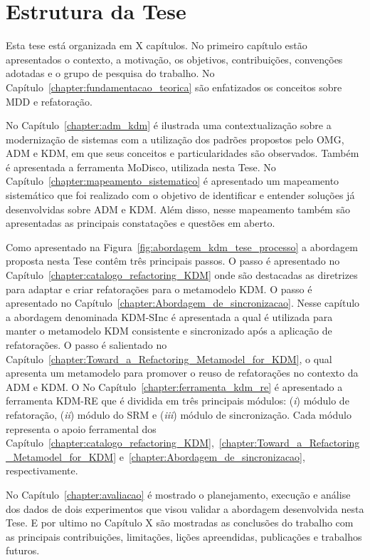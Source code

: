 \section{Estrutura da Tese}

Esta tese está organizada em X capítulos. No primeiro capítulo estão apresentados o contexto, a motivação, os objetivos, contribuições, convenções adotadas e o grupo de pesquisa do trabalho. No Capítulo~\ref{chapter:fundamentacao_teorica} são enfatizados os conceitos sobre MDD e refatoração.

No Capítulo~\ref{chapter:adm_kdm} é ilustrada uma contextualização sobre a modernização de sistemas com a utilização dos padrões propostos pelo OMG, ADM e KDM, em que seus conceitos e particularidades são observados. Também é apresentada a ferramenta MoDisco, utilizada nesta Tese. No Capítulo~\ref{chapter:mapeamento_sistematico} é apresentado um mapeamento sistemático que foi realizado com o objetivo de identificar e entender soluções já desenvolvidas sobre ADM e KDM. Além disso, nesse mapeamento também são apresentadas as principais constatações e questões em aberto.

Como apresentado na Figura~\ref{fig:abordagem_kdm_tese_processo} a abordagem proposta nesta Tese contêm três principais passos. O passo  é apresentado no Capítulo~\ref{chapter:catalogo_refactoring_KDM} onde são destacadas as diretrizes para adaptar e criar refatorações para o metamodelo KDM. O passo  é apresentado no Capítulo~\ref{chapter:Abordagem_de_sincronizacao}. Nesse capítulo a abordagem denominada KDM-SInc é apresentada a qual é utilizada para manter o metamodelo KDM consistente e sincronizado após a aplicação de refatorações. O passo  é salientado no Capítulo~\ref{chapter:Toward_a_Refactoring_Metamodel_for_KDM}, o qual apresenta um metamodelo para promover o reuso de refatorações no contexto da ADM e KDM. O 
No Capítulo~\ref{chapter:ferramenta_kdm_re} é apresentado a ferramenta KDM-RE que é dividida em três principais módulos: (\textit{i}) módulo de refatoração, (\textit{ii}) módulo do SRM e (\textit{iii}) módulo de sincronização. Cada módulo representa o apoio ferramental dos Capítulo~\ref{chapter:catalogo_refactoring_KDM},~\ref{chapter:Toward_a_Refactoring_Metamodel_for_KDM} e~\ref{chapter:Abordagem_de_sincronizacao}, respectivamente.

No Capítulo~\ref{chapter:avaliacao} é mostrado o planejamento, execução e análise dos dados de dois experimentos que visou validar a abordagem desenvolvida nesta Tese.  E por ultimo no Capítulo X são mostradas as conclusões do trabalho com as principais contribuições, limitações, lições apreendidas, publicações e trabalhos futuros.


